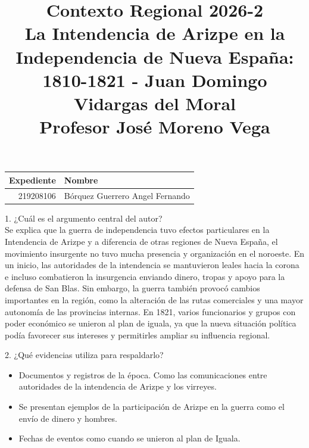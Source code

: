 \documentclass[a4paper, 11pt]{article}
\title
{
    Contexto Regional 2026-2 \\
    La Intendencia de Arizpe en la Independencia de Nueva España: 1810-1821 - Juan Domingo Vidargas del Moral \\

    Profesor José Moreno Vega
}
\begin{document}
\begin{otherlanguage}{spanish}
\maketitle
\end{otherlanguage}

\begin{center}
    \begin{tabular}{r|l}
        \textbf{Expediente} & \textbf{Nombre} \\ \hline
        219208106 & Bórquez Guerrero Angel Fernando \\
    \end{tabular}
\end{center}

{\Large 1. ¿Cuál es el argumento central del autor?} \\
Se explica que la guerra de independencia tuvo efectos particulares en la Intendencia de Arizpe y a diferencia de otras regiones de Nueva España, el movimiento insurgente no tuvo mucha presencia y organización en el noroeste. En un inicio, las autoridades de la intendencia se mantuvieron leales hacia la corona e incluso combatieron la insurgencia enviando dinero, tropas y apoyo para la defensa de San Blas. Sin embargo, la guerra también provocó cambios importantes en la región, como la alteración de las rutas comerciales y una mayor autonomía de las provincias internas. En 1821, varios funcionarios y grupos con poder económico se unieron al plan de iguala, ya que la nueva situación política podía favorecer sus intereses y permitirles ampliar su influencia regional.\par

\vspace{1cm}

{\Large 2. ¿Qué evidencias utiliza para respaldarlo?} \par
\begin{itemize}
    \item Documentos y registros de la época. Como las comunicaciones entre autoridades de la intendencia de Arizpe y los virreyes.
    \item Se presentan ejemplos de la participación de Arizpe en la guerra como el envío de dinero y hombres.
    \item Fechas de eventos como cuando se unieron al plan de Iguala.
\end{itemize}
\end{document}
